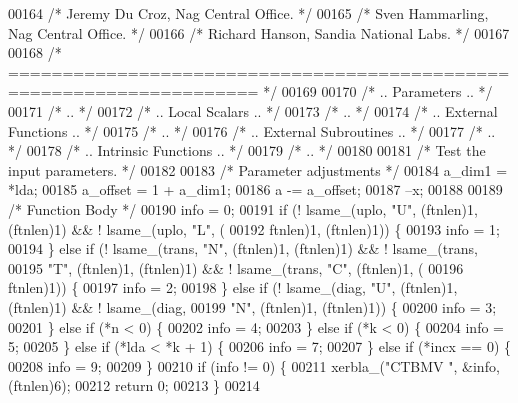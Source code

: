 \begin{DoxyCode}
00164 \textcolor{comment}{/*     Jeremy Du Croz, Nag Central Office. */}
00165 \textcolor{comment}{/*     Sven Hammarling, Nag Central Office. */}
00166 \textcolor{comment}{/*     Richard Hanson, Sandia National Labs. */}
00167 
00168 \textcolor{comment}{/*  ===================================================================== */}
00169 
00170 \textcolor{comment}{/*     .. Parameters .. */}
00171 \textcolor{comment}{/*     .. */}
00172 \textcolor{comment}{/*     .. Local Scalars .. */}
00173 \textcolor{comment}{/*     .. */}
00174 \textcolor{comment}{/*     .. External Functions .. */}
00175 \textcolor{comment}{/*     .. */}
00176 \textcolor{comment}{/*     .. External Subroutines .. */}
00177 \textcolor{comment}{/*     .. */}
00178 \textcolor{comment}{/*     .. Intrinsic Functions .. */}
00179 \textcolor{comment}{/*     .. */}
00180 
00181 \textcolor{comment}{/*     Test the input parameters. */}
00182 
00183     \textcolor{comment}{/* Parameter adjustments */}
00184     a\_dim1 = *lda;
00185     a\_offset = 1 + a\_dim1;
00186     a -= a\_offset;
00187     --x;
00188 
00189     \textcolor{comment}{/* Function Body */}
00190     info = 0;
00191     \textcolor{keywordflow}{if} (! lsame\_(uplo, \textcolor{stringliteral}{"U"}, (ftnlen)1, (ftnlen)1) && ! lsame\_(uplo, \textcolor{stringliteral}{"L"}, (
00192         ftnlen)1, (ftnlen)1)) \{
00193     info = 1;
00194     \} \textcolor{keywordflow}{else} \textcolor{keywordflow}{if} (! lsame\_(trans, \textcolor{stringliteral}{"N"}, (ftnlen)1, (ftnlen)1) && ! lsame\_(trans, 
00195         \textcolor{stringliteral}{"T"}, (ftnlen)1, (ftnlen)1) && ! lsame\_(trans, \textcolor{stringliteral}{"C"}, (ftnlen)1, (
00196         ftnlen)1)) \{
00197     info = 2;
00198     \} \textcolor{keywordflow}{else} \textcolor{keywordflow}{if} (! lsame\_(diag, \textcolor{stringliteral}{"U"}, (ftnlen)1, (ftnlen)1) && ! lsame\_(diag, 
00199         \textcolor{stringliteral}{"N"}, (ftnlen)1, (ftnlen)1)) \{
00200     info = 3;
00201     \} \textcolor{keywordflow}{else} \textcolor{keywordflow}{if} (*n < 0) \{
00202     info = 4;
00203     \} \textcolor{keywordflow}{else} \textcolor{keywordflow}{if} (*k < 0) \{
00204     info = 5;
00205     \} \textcolor{keywordflow}{else} \textcolor{keywordflow}{if} (*lda < *k + 1) \{
00206     info = 7;
00207     \} \textcolor{keywordflow}{else} \textcolor{keywordflow}{if} (*incx == 0) \{
00208     info = 9;
00209     \}
00210     \textcolor{keywordflow}{if} (info != 0) \{
00211     xerbla\_(\textcolor{stringliteral}{"CTBMV "}, &info, (ftnlen)6);
00212     \textcolor{keywordflow}{return} 0;
00213     \}
00214 

\end{DoxyCode}
